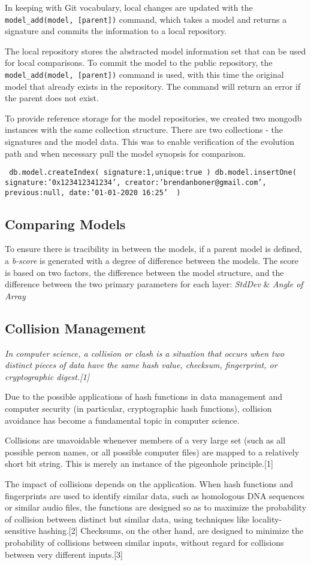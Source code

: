 In keeping with Git vocabulary, local changes are updated with the \verb|model_add(model, [parent])| command, which takes a model and returns a signature and commits the information to a local repository.

The local repository stores the abstracted model information set that can be used for local comparisons.
To commit the model to the public repository, the \verb|model_add(model, [parent])| command is used, with this time the original model that already exists in the repository. The command will return an error if the parent does not exist.


To provide reference storage for the model repositories, we created two mongodb instances with the same collection structure. There are two collections - the signatures and the model data. This was to enable verification of the evolution path and when necessary pull the model synopsis for comparison.

\texttt{
    db.model.createIndex( {signature:1},{unique:true} )
    db.model.insertOne( { signature:'0x123412341234', creator:'brendanboner@gmail.com', previous:null, date:'01-01-2020 16:25' } )
}

\subsection{Comparing Models}
To ensure there is tracibility in between the models, if a parent model is defined, a \textit{b-score} is generated with a degree of difference between the models. The score is based on two factors, the difference between the model structure, and the difference between the two primary parameters for each layer: \textit{StdDev} \& \textit{Angle of Array}

\subsection{Collision Management}

{ \itshape
In computer science, a collision or clash is a situation that occurs when two distinct pieces of data have the same hash value, checksum, fingerprint, or cryptographic digest.[1]

Due to the possible applications of hash functions in data management and computer security (in particular, cryptographic hash functions), collision avoidance has become a fundamental topic in computer science.

Collisions are unavoidable whenever members of a very large set (such as all possible person names, or all possible computer files) are mapped to a relatively short bit string. This is merely an instance of the pigeonhole principle.[1]

The impact of collisions depends on the application. When hash functions and fingerprints are used to identify similar data, such as homologous DNA sequences or similar audio files, the functions are designed so as to maximize the probability of collision between distinct but similar data, using techniques like locality-sensitive hashing.[2] Checksums, on the other hand, are designed to minimize the probability of collisions between similar inputs, without regard for collisions between very different inputs.[3]
}
